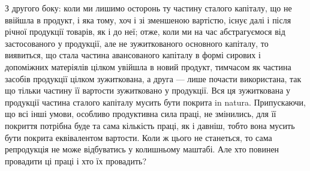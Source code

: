 З другого боку: коли ми лишимо осторонь ту частину сталого капіталу,
що не ввійшла в продукт, і яка тому, хоч і зі зменшеною вартістю, існує далі
і після річної продукції товарів, як і до неї; отже, коли ми на час абстрагуємося
від застосованого у продукції, але не зужиткованого основного капіталу, то
виявиться, що стала частина авансованого капіталу в формі сирових і допоміжних
матеріялів цілком увійшла в новий продукт, тимчасом як частина засобів продукції
цілком зужиткована, а друга — лише почасти використана, так що тільки
частину її вартости зужитковано у продукції. Вся ця зужиткована у продукції частина
сталого капіталу мусить бути покрита in natura. Припускаючи, що всі інші
умови, особливо продуктивна сила праці, не змінились, для її покриття потрібна
буде та сама кількість праці, як і давніш, тобто вона мусить бути
покрита еквівалентом вартости. Коли ж цього не станеться, то сама репродукція
не може відбуватись у колишньому маштабі. Але хто повинен провадити ці
праці і хто їх провадить?
